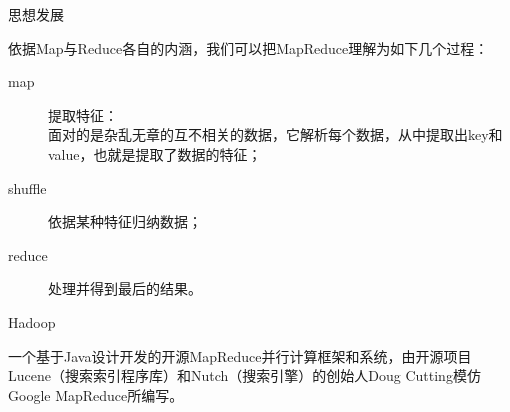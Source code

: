 \begin{frame}{\begin{CJK}{UTF8}{gkai}思想发展
	\end{CJK}}
	\begin{CJK}{UTF8}{gkai}依据Map与Reduce各自的内涵，我们可以把MapReduce理解为如下几个过程：
	\end{CJK}
	\begin{description}
		\item[map] \begin{CJK}{UTF8}{gkai}提取特征：\\
			面对的是杂乱无章的互不相关的数据，它解析每个数据，从中提取出key和value，也就是提取了数据的特征；
		\end{CJK}
		\item[shuffle] \begin{CJK}{UTF8}{gkai}依据某种特征归纳数据；\end{CJK}
		\item[reduce] \begin{CJK}{UTF8}{gkai}处理并得到最后的结果。
		\end{CJK}
	\end{description}
	
	\begin{block}{Hadoop}
		\begin{CJK}{UTF8}{gkai}
			一个基于Java设计开发的开源MapReduce并行计算框架和系统，由开源项目Lucene（搜索索引程序库）和Nutch（搜索引擎）的创始人Doug Cutting模仿Google MapReduce所编写。
			
		\end{CJK}
	\end{block}
	
\end{frame}

